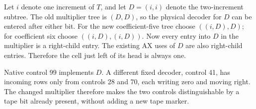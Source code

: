 \documentclass[10pt,letterpaper]{article}
\begin{document}
Let $i$ denote one increment of $T$, and let $D=(i,i)$ denote the two-increment subtree. The old multiplier tree is $(D,D)$, so the physical decoder for $D$ can be entered after either bit. For the new coefficient-five tree choose $((i,D),D)$; for coefficient six choose $((i,D),(i,D))$. Now every entry into $D$ in the multiplier is a right-child entry. The existing AX uses of $D$ are also right-child entries. Therefore the cell just left of its head is always one.

\begin{center}
\end{center}

Native control 99 implements $D$. A different fixed decoder, control 41, has incoming rows only from controls 28 and 70, each writing zero and moving right. The changed multiplier therefore makes the two controls distinguishable by a tape bit already present, without adding a new tape marker.
\end{document}
